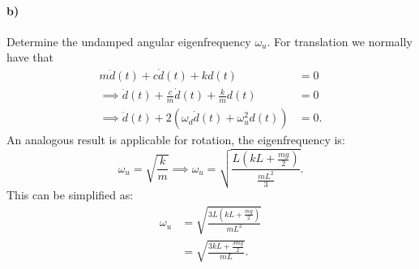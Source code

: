 \paragraph{b)}
Determine the undamped angular eigenfrequency $\omega_u$.
\bigbreak
For translation we normally have that
\begin{align*}
  m \ddot{d}(t) + c \dot{d}(t) + kd(t) &= 0 \\
  \implies \ddot{d}(t) + \frac{c}{m} \dot{d}(t) + \frac{k}{m} d(t) &= 0 \\
  \implies \ddot{d}(t) + 2 \left( \omega_d \dot{d}(t) + \omega_u^2 d(t) \right) &= 0
.\end{align*}
An analogous result is applicable for rotation, the eigenfrequency is:
\[ 
\omega_u = \sqrt{\frac{k}{m}} \implies \omega_u = \sqrt{\frac{L \left( kL + \frac{mg}{2} \right)}{\frac{m L^2}{3}}}
.\]
This can be simplified as:
\begin{align*}
  \omega_u &= \sqrt{\frac{3L \left( k L + \frac{mg}{2} \right)}{m L^2}} \\
  &= \sqrt{\frac{3 k L + \frac{3mg}{2}}{mL}}
.\end{align*}


